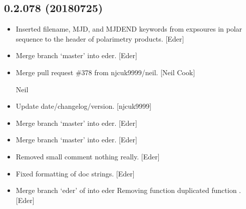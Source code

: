 \documentclass[a4paper,10pt,english]{report}
\begin{document}
\subsection{0.2.078 (2018\sphinxhyphen{}07\sphinxhyphen{}25)}
\label{\detokenize{misc/changelog:id404}}\begin{itemize}
\item {} 
Inserted filename, MJD, and MJDEND keywords from expsoures in polar
sequence to the header of polarimetry products. {[}Eder{]}

\item {} 
Merge branch ‘master’ into eder. {[}Eder{]}

\item {} 
Merge pull request \#378 from njcuk9999/neil. {[}Neil Cook{]}

Neil

\item {} 
Update date/changelog/version. {[}njcuk9999{]}

\item {} 
Merge branch ‘master’ into eder. {[}Eder{]}

\item {} 
Merge branch ‘master’ into eder. {[}Eder{]}

\item {} 
Removed small comment \textendash{} nothing really. {[}Eder{]}

\item {} 
Fixed formatting of doc strings. {[}Eder{]}

\item {} 
Merge branch ‘eder’ of  into
eder Removing function duplicated function . {[}Eder{]}

\end{itemize}
\end{document}
